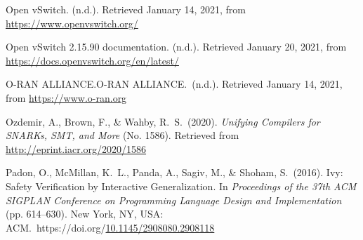 \documentclass[12pt,twoside]{article}
\begin{document}
{\begin{thebibliography}{1079}
\mdbibitemlabel{}Open vSwitch. (n.d.). Retrieved January 14, 2021, from \href{https://www.openvswitch.org/}{{\ttfamily https://\hspace{0pt}www.\hspace{0pt}openvswitch.\hspace{0pt}org/\hspace{0pt}}}%

\mdbibitemlabel{}Open vSwitch 2.15.90 documentation. (n.d.). Retrieved January 20, 2021, from \href{https://docs.openvswitch.org/en/latest/}{{\ttfamily https://\hspace{0pt}docs.\hspace{0pt}openvswitch.\hspace{0pt}org/\hspace{0pt}en/\hspace{0pt}latest/\hspace{0pt}}}%

\mdbibitemlabel{}O-RAN ALLIANCE.O-RAN ALLIANCE.~(n.d.). Retrieved January 14, 2021, from \href{https://www.o-ran.org}{{\ttfamily https://\hspace{0pt}www.\hspace{0pt}o-\hspace{0pt}ran.\hspace{0pt}org}}%

\mdbibitemlabel{}Ozdemir, A., Brown, F., \& Wahby, R.~S.~(2020). \emph{Unifying Compilers for SNARKs, SMT, and More} (No. 1586). Retrieved from \href{http://eprint.iacr.org/2020/1586}{{\ttfamily http://\hspace{0pt}eprint.\hspace{0pt}iacr.\hspace{0pt}org/\hspace{0pt}2020/\hspace{0pt}1586}}%

\mdbibitemlabel{}Padon, O., McMillan, K.~L., Panda, A., Sagiv, M., \& Shoham, S.~(2016). Ivy: Safety Verification by Interactive Generalization. In \emph{Proceedings of the 37th ACM SIGPLAN Conference on Programming Language Design and Implementation} (pp. 614–630). New York, NY, USA: ACM.~https://doi.org/\href{https://dx.doi.org/10.1145/2908080.2908118}{10.1145/2908080.2908118}%


\end{thebibliography}}
\end{document}
